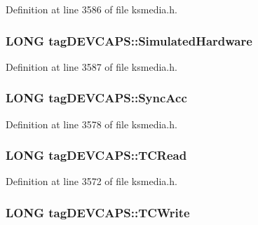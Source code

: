 Definition at line 3586 of file ksmedia.\+h.

\subsubsection[{\texorpdfstring{Simulated\+Hardware}{SimulatedHardware}}]{\setlength{\rightskip}{0pt plus 5cm}L\+O\+NG tag\+D\+E\+V\+C\+A\+P\+S\+::\+Simulated\+Hardware}\hypertarget{structtag_d_e_v_c_a_p_s_abe1bb39167453597db394369b95e6ec6}{}\label{structtag_d_e_v_c_a_p_s_abe1bb39167453597db394369b95e6ec6}


Definition at line 3587 of file ksmedia.\+h.

\subsubsection[{\texorpdfstring{Sync\+Acc}{SyncAcc}}]{\setlength{\rightskip}{0pt plus 5cm}L\+O\+NG tag\+D\+E\+V\+C\+A\+P\+S\+::\+Sync\+Acc}\hypertarget{structtag_d_e_v_c_a_p_s_ad7c11b3e75997845b0e2fec8e9f74871}{}\label{structtag_d_e_v_c_a_p_s_ad7c11b3e75997845b0e2fec8e9f74871}


Definition at line 3578 of file ksmedia.\+h.

\subsubsection[{\texorpdfstring{T\+C\+Read}{TCRead}}]{\setlength{\rightskip}{0pt plus 5cm}L\+O\+NG tag\+D\+E\+V\+C\+A\+P\+S\+::\+T\+C\+Read}\hypertarget{structtag_d_e_v_c_a_p_s_a274d46458425c5b2979e37149c81490f}{}\label{structtag_d_e_v_c_a_p_s_a274d46458425c5b2979e37149c81490f}


Definition at line 3572 of file ksmedia.\+h.

\subsubsection[{\texorpdfstring{T\+C\+Write}{TCWrite}}]{\setlength{\rightskip}{0pt plus 5cm}L\+O\+NG tag\+D\+E\+V\+C\+A\+P\+S\+::\+T\+C\+Write}\hypertarget{structtag_d_e_v_c_a_p_s_a2a43c901ada8408965b3af9b4b1adf14}{}\label{structtag_d_e_v_c_a_p_s_a2a43c901ada8408965b3af9b4b1adf14}


